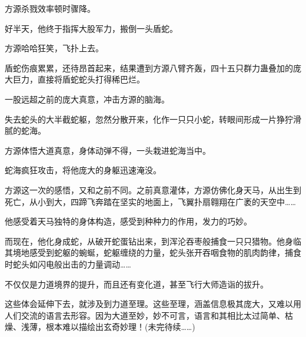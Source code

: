 \begin{this_body}
方源杀戮效率顿时骤降。

好半天，他终于指挥大股军力，搬倒一头盾蛇。

方源哈哈狂笑，飞扑上去。

盾蛇伤痕累累，还待昂首起来，结果遭到方源八臂齐轰，四十五只群力蛊叠加的庞大巨力，直接将盾蛇蛇头打得稀巴烂。

一股远超之前的庞大真意，冲击方源的脑海。

失去蛇头的大半截蛇躯，忽然分散开来，化作一只只小蛇，转眼间形成一片狰狞滑腻的蛇海。

方源体悟大道真意，身体动弹不得，一头栽进蛇海当中。

蛇海疯狂攻击，将他庞大的身躯迅速淹没。

方源这一次的感悟，又和之前不同。之前真意灌体，方源仿佛化身天马，从出生到死亡，从小到大，四蹄飞奔踏在坚实的地面上，飞翼扑扇翱翔在广袤的天空中……

他感受着天马独特的身体构造，感受到种种力的作用，发力的巧妙。

而现在，他化身成蛇，从破开蛇蛋钻出来，到浑沦吞枣般捕食一只只猎物。他身临其境地感受到蛇躯的蜿蜒，蛇躯缠绕的力量，蛇头张开吞咽食物的肌肉韵律，捕食时蛇头如闪电般出击的力量调动……

不仅仅是力道境界的提升，而且还有变化道，甚至飞行大师造诣的拔升。

这些体会延伸下去，就涉及到力道至理。这些至理，涵盖信息极其庞大，又难以用人们交流的语言去形容。因为大道至妙，妙不可言，语言和其相比太过简单、枯燥、浅薄，根本难以描绘出玄奇妙理！(未完待续……)

\end{this_body}

